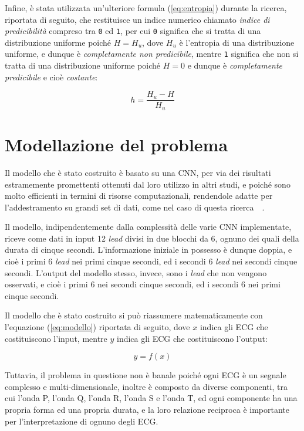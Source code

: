Infine, è stata utilizzata un'ulteriore formula (\ref{eq:entropia}) durante la ricerca, riportata di seguito, che restituisce un indice numerico chiamato \textit{indice di predicibilità} compreso tra \texttt{0} ed \texttt{1}, per cui \texttt{0} significa che si tratta di una distribuzione uniforme poiché $ H = H_{u} $, dove $ H_{u} $ è l'entropia di una distribuzione uniforme, e dunque è \textit{completamente non predicibile}, mentre \texttt{1} significa che non si tratta di una distribuzione uniforme poiché $ H = 0 $ e dunque è \textit{completamente predicibile} e cioè \textit{costante}:

\begin{equation}
    h = \frac{H_{u} - H}{H_{u}}
    \label{eq:entropia}
\end{equation}

\section{Modellazione del problema}
\label{sec:modellazione}

Il modello che è stato costruito è basato su una CNN, per via dei risultati estramemente promettenti ottenuti dal loro utilizzo in altri studi, e poiché sono molto efficienti in termini di risorse computazionali, rendendole adatte per l'addestramento su grandi set di dati, come nel caso di questa ricerca~\cite{ribeiro}~\cite{hannun}.

Il modello, indipendentemente dalla complessità delle varie CNN implementate, riceve come dati in input 12 \textit{lead} divisi in due blocchi da 6, ognuno dei quali della durata di cinque secondi. L'informazione iniziale in possesso è dunque doppia, e cioè i primi 6 \textit{lead} nei primi cinque secondi, ed i secondi 6 \textit{lead} nei secondi cinque secondi. L'output del modello stesso, invece, sono i \textit{lead} che non vengono osservati, e cioè i primi 6 nei secondi cinque secondi, ed i secondi 6 nei primi cinque secondi.

Il modello che è stato costruito si può riassumere matematicamente con l'equazione (\ref{eq:modello}) riportata di seguito, dove $ x $ indica gli ECG che costituiscono l'input, mentre $ y $ indica gli ECG che costituiscono l'output:

\begin{equation}
    y = f(x)
    \label{eq:modello}
\end{equation}

Tuttavia, il problema in questione non è banale poiché ogni ECG è un segnale complesso e multi-dimensionale, inoltre è composto da diverse componenti, tra cui l'onda P, l'onda Q, l'onda R, l'onda S e l'onda T, ed ogni componente ha una propria forma ed una propria durata, e la loro relazione reciproca è importante per l'interpretazione di ognuno degli ECG.

